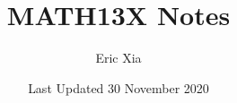 \documentclass{article}
\title{MATH13X Notes}
\author{Eric Xia}
\date{Last Updated 30 November 2020}
\begin{document}
    \maketitle
    \tableofcontents
    \pagebreak



    
    
    
    
    
    


    
\end{document}
